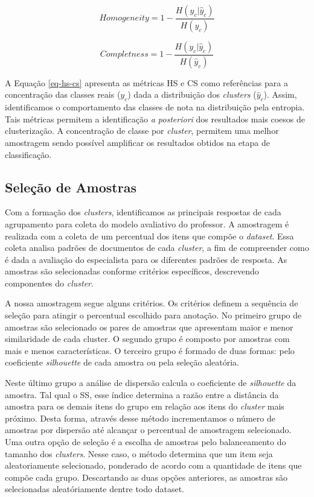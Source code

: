 \begin{equation}
Homogeneity = 1 - \frac{H(y_{c} | \hat{y}_{c})}{H(y_{c})}
\label{eq-hs-cs}
\end{equation}

\begin{equation*}
Completness = 1 - \frac{H(y_{c} | \hat{y}_{c})}{H(\hat{y}_{c})}
\end{equation*}

A Equação \ref{eq-hs-cs} apresenta as métricas HS e CS como referências para a concentração das classes reais ($y_{c}$) dada a distribuição dos \textit{clusters} ($\hat{y}_{c}$). Assim, identificamos o comportamento das classes de nota na distribuição pela entropia. Tais métricas permitem a identificação \textit{a posteriori} dos resultados mais coesos de clusterização. A concentração de classe por \textit{cluster}, permitem uma melhor amostragem sendo possível amplificar os resultados obtidos na etapa de classificação.


\subsection{Seleção de Amostras}
\label{subsec-selecao-amostras}

Com a formação dos \textit{clusters}, identificamos as principais respostas de cada agrupamento para coleta do modelo avaliativo do professor. A amostragem é realizada com a coleta de um percentual dos itens que compõe o \textit{dataset}. Essa coleta analisa padrões de documentos de cada \textit{cluster}, a fim de compreender como é dada a avaliação do especialista para os diferentes padrões de resposta. As amostras são selecionadas conforme critérios específicos, descrevendo componentes do \textit{cluster}. 

A nossa amostragem segue alguns critérios. Os critérios definem a sequência de seleção para atingir o percentual escolhido para anotação. No primeiro grupo de amostras são selecionado os pares de amostras que apresentam maior e menor similaridade de cada cluster. O segundo grupo é composto por amostras com mais e menos características. O terceiro grupo é formado de duas formas: pelo coeficiente \textit{silhouette} \cite{rousseeuw1987} de cada amostra ou pela seleção aleatória.

Neste último grupo a análise de dispersão calcula o coeficiente de \textit{silhouette} da amostra. Tal qual o SS, esse índice determina a razão entre a distância da amostra para os demais itens do grupo em relação aos itens do \textit{cluster} mais próximo. Desta forma, através desse método incrementamos o número de amostras por dispersão até alcançar o percentual de amostragem selecionado. Uma outra opção de seleção é a escolha de amostras pelo balanceamento do tamanho dos \textit{clusters}. Nesse caso, o método determina que um item seja aleatoriamente selecionado, ponderado de acordo com a quantidade de itens que compõe cada grupo. Descartando as duas opções anteriores, as amostras são selecionadas aleatóriamente dentre todo dataset.

